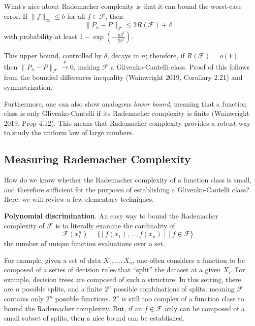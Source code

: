 \documentclass[
]{article}
\begin{document}
What's nice about Rademacher complexity is that it can bound the
worst-case error. If \(\lVert f \rVert_\infty \leq b\) for all
\(f \in \mathscr{F}\), then
\[\lVert P_n - P \rVert_{\mathscr{F}} \leq 2R(\mathscr{F}) + \delta\]
with probability at least \(1 - \exp(- \frac{n \delta^2}{2b^2})\).

This upper bound, controlled by \(\delta\), decays in \(n\); therefore,
if \(R(\mathscr{F}) = o(1)\) then
\(\lVert P_n - P \rVert_{\mathscr{F}} \overset{p}{\rightarrow} 0\),
making \(\mathscr{F}\) a Glivenko-Cantelli class. Proof of this follows
from the bounded differences inequality (Wainwright 2019, Corollary
2.21) and symmetrization.

Furthermore, one can also show analogous \emph{lower bound}, meaning
that a function class is only Glivenko-Cantelli if its Rademacher
complexity is finite (Wainwright 2019, Prop 4.12). This means that
Rademacher complexity provides a robust way to study the uniform law of
large numbers.

\hypertarget{measuring-rademacher-complexity}{%
\subsection{Measuring Rademacher
Complexity}\label{measuring-rademacher-complexity}}

How do we know whether the Rademacher complexity of a function class is
small, and therefore sufficient for the purposes of establishing a
Glivenko-Cantelli class? Here, we will review a few elementary
techniques.

\textbf{Polynomial discrimination}. An easy way to bound the Rademacher
complexity of \(\mathscr{F}\) is to literally examine the cardinality of
\[\mathscr{F}(x_1^n) = \Big\{[f(x_1), \ldots, f(x_n)] \mid f \in \mathscr{F}\Big\}\]
the number of unique function evaluations over a set.

For example, given a set of data \(X_1, \ldots, X_n\), one often
considers a function to be composed of a series of decision rules that
``split'' the dataset at a given \(X_i\). For example, decision trees
are composed of such a structure. In this setting, there are \(n\)
possible splits, and a finite \(2^n\) possible combinations of splits,
meaning \(\mathscr{F}\) contains only \(2^n\) possible functions.
\(2^n\) is still too complex of a function class to bound the Rademacher
complexity. But, if an \(f \in \mathscr{F}\) only can be composed of a
small subset of splits, then a nice bound can be established.
\end{document}
